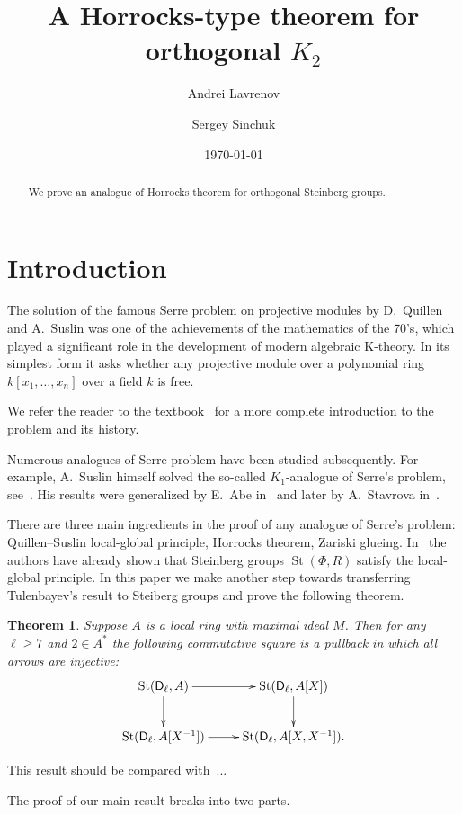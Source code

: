 \documentclass[oneside, 8pt]{amsart}
\title{A Horrocks-type theorem for orthogonal $K_2$}
\author{Andrei Lavrenov}
\author {Sergey Sinchuk}
\date {\today}
\newtheorem*{theorem*}{Theorem}
\theoremstyle{remark}
\theoremstyle{definition}
\numberwithin{lemma}{section}
\numberwithin{prop}{section}
\numberwithin{corollary}{section}
\numberwithin{externaltheorem}{section}
\DeclareMathOperator{\St}{St}
\newcommand{\inv}{^{-1}}
\newcommand{\rD}{\mathsf{D}}
\numberwithin{equation}{section}
\begin{document}
\begin{abstract} We prove an analogue of Horrocks theorem for orthogonal Steinberg groups. \end{abstract}
\maketitle
\section{Introduction}

The solution of the famous Serre problem on projective modules by D.~Quillen and A.~Suslin was one of the achievements of the mathematics of the 70's,
 which played a significant role in the development of modern algebraic K-theory. In its simplest form it asks whether any projective module over a polynomial ring $k[x_1,\ldots, x_n]$ over a field $k$ is free. 
 
We refer the reader to the textbook~\cite{Lam10} for a more complete introduction to the problem and its history.

Numerous analogues of Serre problem have been studied subsequently. For example, A.~Suslin himself solved the so-called $K_1$-analogue of Serre's problem, see~\cite{Su77}.
His results were generalized by E.~Abe in~\cite{Abe83} and later by A.~Stavrova in~\cite{St-poly}.

There are three main ingredients in the proof of any analogue of Serre's problem: Quillen--Suslin local-global principle, Horrocks theorem, Zariski glueing.
In~\cite{LS17} the authors have already shown that Steinberg groups $\St(\Phi, R)$ satisfy the local-global principle. In this paper we make another step towards
 transferring Tulenbayev's result to Steiberg groups and prove the following theorem.
\begin{theorem*} Suppose $A$ is a local ring with maximal ideal $M$. Then for any $\ell \geq 7$ and $2 \in A^*$ the following commutative square is a pullback in which all arrows are injective:
 \begin{equation} \nonumber
  \xymatrix{ \St(\rD_\ell, A) \ar[r] \ar[d] & \St(\rD_\ell, A[X]) \ar[d] \\ \St(\rD_\ell, A[X\inv]) \ar[r] & \St(\rD_\ell, A[X, X\inv]).}
 \end{equation}
\end{theorem*}
This result should be compared with~\cite[Theorem~1.1]{St-poly}...

The proof of our main result breaks into two parts. 
\end{document}
